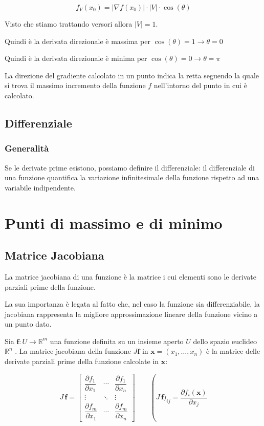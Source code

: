 $$
f_V(x_0)  = |\nabla f(x_0)| \cdot |V| \cdot \cos(\theta)
$$

Visto che stiamo trattando versori allora $|V|=1$.

Quindi è la derivata direzionale è massima per $\cos(\theta)=1 \rightarrow \theta=0$

Quindi è la derivata direzionale è minima per $\cos(\theta)=0 \rightarrow \theta=\pi$

La direzione del gradiente calcolato in un punto indica la retta seguendo la quale si trova il massimo incremento della funzione $f$ nell'intorno del punto in cui è calcolato.

\subsection{Differenziale}

\subsubsection{Generalità}

Se le derivate prime esistono, possiamo definire il differenziale: il differenziale di una funzione quantifica la variazione infinitesimale della funzione rispetto ad una variabile indipendente.


\section{Punti di massimo e di minimo}

\subsection{Matrice Jacobiana}

La matrice jacobiana di una funzione è la matrice i cui elementi sono le derivate parziali prime della funzione.

La sua importanza è legata al fatto che, nel caso la funzione sia differenziabile, la jacobiana rappresenta la migliore approssimazione lineare della funzione vicino a un punto dato.


Sia $\mathbf{f}: U \rightarrow \mathbb R^m$ una funzione definita su un insieme aperto $U$ dello spazio euclideo  $\mathbb R^n$ . La matrice jacobiana della funzione $J {\mathbf f}$ in $\mathbf x = (x_1, \dots, x_n)$ è la matrice delle derivate parziali prime della funzione calcolate in $\mathbf x$:

$$J \, \mathbf f = \begin{bmatrix} \dfrac{\partial f_1}{\partial x_1} & \cdots & \dfrac{\partial f_1}{\partial x_n} \\ \vdots & \ddots & \vdots \\ \dfrac{\partial f_m}{\partial x_1} & \cdots & \dfrac{\partial f_m}{\partial x_n}  \end{bmatrix}\qquad \operatorname (J \, \mathbf f)_{ij} = \frac{\partial f_i (\mathbf {x})}{\partial x_j} $$

